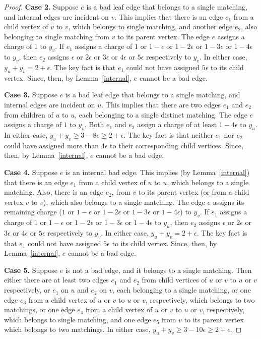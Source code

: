\documentclass[11pt]{article}
\begin{document}
\begin{proof}
	 
   \textbf{Case 2.} Suppose $e$ is a bad leaf edge that belongs to a single matching, and internal edges are incident on $v$. This implies that there is an edge $e_1$ from a child vertex of $v$ to $v$, which belongs to single matching, and another edge $e_2$, also belonging to single matching from $v$ to its parent vertex. The edge $e$ assigns a charge of $1$ to $y_v$. If $e_1$ assigns a charge of $1$ or $1-\epsilon$ or $1-2\epsilon$ or $1-3\epsilon$  or $1-4\epsilon$ to $y_v$, then $e_2$ assigns $\epsilon$ or $2\epsilon$ or $3\epsilon$ or $4\epsilon$ or $5\epsilon$ respectively to $y_v$.  In either case, $y_u+y_v=2+\epsilon$. The key fact is  that $e_1$ could not have assigned $5\epsilon$ to its child vertex. Since, then, by Lemma~\ref{internal}, $e$ cannot be a bad edge.

   \textbf{Case 3.} Suppose $e$ is a bad leaf edge that belongs to a single matching, and internal edges are incident on $u$. This implies that there are two edges $e_1$ and $e_2$ from children of $u$ to $u$, each belonging to a single distinct matching. The edge $e$ assigns a charge of $1$ to $y_v$. Both $e_1$ and $e_2$ assign a charge of at least $1-4\epsilon$ to $y_u$. In either case, $y_u+y_v\geq 3-8\epsilon \geq 2+\epsilon$. The key fact is that neither $e_1$ nor $e_2$ could have assigned more than $4\epsilon$ to their corresponding child vertices. Since, then, by Lemma~\ref{internal}, $e$ cannot be a bad edge.

      
   \textbf{Case 4.} Suppose $e$ is an internal bad edge. This implies (by Lemma~\ref{internal}) that there is an edge  $e_1$ from a child vertex of $u$ to $u$, which belongs to a single  matching. Also, there is an edge $e_2$, from $v$ to its parent vertex (or from a child vertex $v$ to $v$), which also belongs to a single matching. The edge $e$ assigns its remaining charge ($1$ or $1-\epsilon$ or $1-2\epsilon$ or $1-3\epsilon$  or $1-4\epsilon$) to $y_v$. If $e_1$ assigns a charge of $1$ or $1-\epsilon$ or $1-2\epsilon$ or $1-3\epsilon$  or $1-4\epsilon$ to $y_u$, then $e_2$ assigns $\epsilon$ or $2\epsilon$ or $3\epsilon$ or $4\epsilon$ or $5\epsilon$ respectively to $y_v$.  In either case, $y_u+y_v=2+\epsilon$. The key fact is  that $e_1$ could not have assigned $5\epsilon$ to its child vertex. Since, then, by Lemma~\ref{internal}, $e$ cannot be a bad edge.
  
  \textbf{Case 5.} Suppose $e$ is not a bad edge, and it belongs to a single matching. Then either there are at least two edges $e_1$ and $e_2$ from child vertices of $u$ or $v$ to $u$ or $v$ respectively, or $e_1$ on $u$ and $e_2$ on $v$, each belonging to a single matching, or one edge $e_3$ from a child vertex of $u$ or $v$ to $u$ or $v$, respectively, which belongs to two matchings, or one edge $e_4$ from a child vertex of $u$ or $v$ to $u$ or $v$, respectively, which belongs to single matching, and one edge $e_5$  from $v$ to its parent vertex which belongs to two matchings. In either case, $y_u+y_v\geq 3-10\epsilon\geq 2+\epsilon$.
    

\end{proof}
\end{document}
